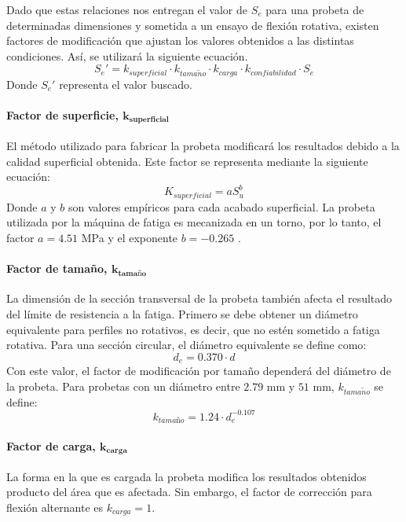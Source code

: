 Dado que estas relaciones nos entregan el valor de $S_e$ para una probeta de determinadas dimensiones y sometida a un ensayo de flexión rotativa, existen factores de modificación que ajustan los valores obtenidos a las distintas condiciones. Así, se utilizará la siguiente ecuación.
\begin{equation}\label{eq:se_prima}
	S_e' = k_{superficial} \cdot k_{tama\tilde{n}o} \cdot k_{carga} \cdot k_{confiabilidad} \cdot S_e
\end{equation}
Donde $S_e'$ representa el valor buscado.

\paragraph{Factor de superficie, $\mathbf{k_{superficial}}$}
El método utilizado para fabricar la probeta modificará los resultados debido a la calidad superficial obtenida. Este factor se representa mediante la siguiente ecuación:
\begin{equation}
	K_{superficial} = aS_u^b
\end{equation}
Donde $a$ y $b$ son valores empíricos para cada acabado superficial. La probeta utilizada por la máquina de fatiga es mecanizada en un torno, por lo tanto, el factor $a = 4.51$ MPa y el exponente $b = -0.265$ \cite{budynas2008shigley}.

\paragraph{Factor de tamaño, $\mathbf{k_{\text{tamaño}}}$}
La dimensión de la sección transversal de la probeta también afecta el resultado del límite de resistencia a la fatiga. Primero se debe obtener un diámetro equivalente para perfiles no rotativos, es decir, que no estén sometido a fatiga rotativa. Para una sección circular, el diámetro equivalente se define como:
\begin{equation}
	d_e = 0.370\cdot d
\end{equation}
Con este valor, el factor de modificación por tamaño dependerá del diámetro de la probeta. Para probetas con un diámetro entre $2.79$ mm y $51$ mm,  $k_{tama\tilde{n}o}$ se define:
\begin{equation}
	k_{tamaño} = 1.24\cdot d_e^{-0.107}
\end{equation}

\paragraph{Factor de carga, $\mathbf{k_{carga}}$}
La forma en la que es cargada la probeta modifica los resultados obtenidos producto del área que es afectada. Sin embargo, el factor de corrección para flexión alternante es $k_{carga} = 1$.

